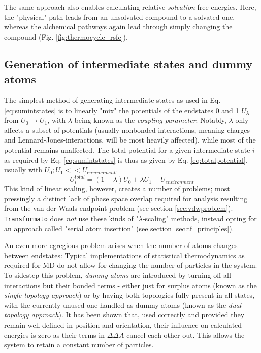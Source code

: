 \documentclass[oneside]{scrreprt}
\begin{document}
The same approach also enables calculating relative \emph{solvation} free energies. Here, the "physical" path leads from an unsolvated compound to a solvated one, whereas the alchemical pathways again lead through simply changing the compound (Fig. \ref{fig:thermocycle_rsfe}).

\subsection{Generation of intermediate states and dummy atoms} \label{sec:intstatesanddummys}

The simplest method of generating intermediate states as used in Eq. \ref{eq:sumintstates} is to linearly "mix" the  potentials of the endstates 0 and 1 $U_\lambda$ from $U_0 \rightarrow U_1$, with $\lambda$ being known as the \emph{coupling parameter}. Notably, $\lambda$ only affects a subset of potentials (usually nonbonded interactions, meaning charges and Lennard-Jones-interactions, will be most heavily affected), while most of the potential remains unaffected. The total potential for a given intermediate state $i$ as required by Eq. \ref{eq:sumintstates} is thus as given by Eq. \ref{eq:totalpotential}, usually with $U_0; U_1 << U_{environment}$.
\begin{equation}
U^{total}_i   = (1-\lambda)U_0 + \lambda U_1  + U_{environment}
\label{eq:totalpotential}
\end{equation}
This kind of linear scaling, however, creates a number of problems; most pressingly a distinct lack of phase space overlap required for analysis resulting from the van-der-Waals endpoint problem (see section \ref{sec:vdwproblem}). \texttt{Transformato} does \emph{not} use these kinds of "$\lambda$-scaling" methods, instead opting for an approach called "serial atom insertion" (see section \ref{sec:tf_principles}).

An even more egregious problem arises when the number of atoms changes between endstates: Typical implementations of statistical thermodynamics as required for MD do not allow for changing the number of particles in the system. To sidestep this problem, \emph{dummy atoms} are introduced by turning off all interactions but their bonded terms - either just for surplus atoms (known as the \emph{single topology approach}) or by having both topologies fully present in all states, with the currently unused one handled as dummy atoms (known as the \emph{dual topology approach}). It has been shown that, used correctly and provided they remain well-defined in position and orientation, their influence on calculated energies is zero as their terms in $\Delta \Delta A$  cancel each other out\cite{fleckDummyAtomsAlchemical2021}. This allows the system to retain a constant number of particles.
\end{document}
